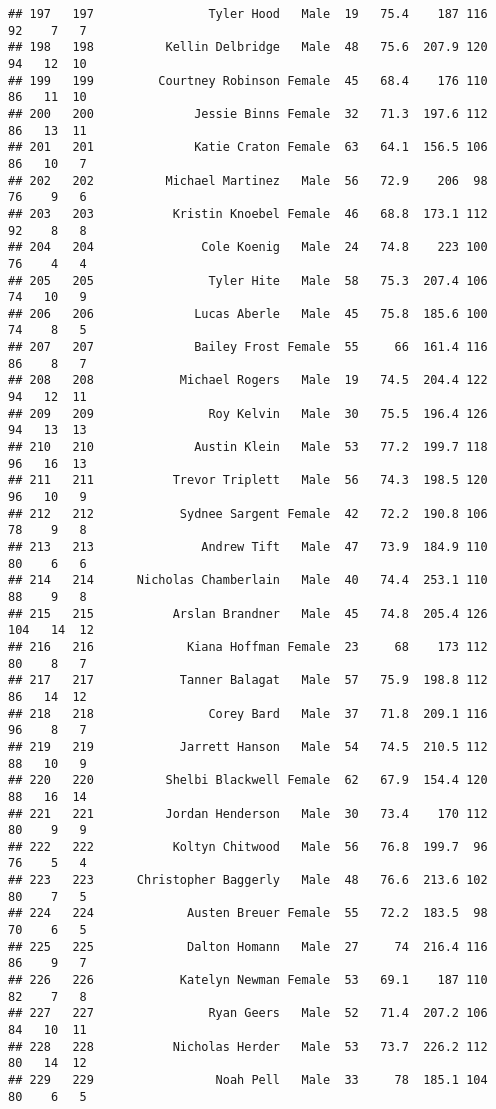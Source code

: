 \documentclass[
]{article}
\begin{document}
\begin{verbatim}
## 197   197                Tyler Hood   Male  19   75.4    187 116  92    7   7
## 198   198          Kellin Delbridge   Male  48   75.6  207.9 120  94   12  10
## 199   199         Courtney Robinson Female  45   68.4    176 110  86   11  10
## 200   200              Jessie Binns Female  32   71.3  197.6 112  86   13  11
## 201   201              Katie Craton Female  63   64.1  156.5 106  86   10   7
## 202   202          Michael Martinez   Male  56   72.9    206  98  76    9   6
## 203   203           Kristin Knoebel Female  46   68.8  173.1 112  92    8   8
## 204   204               Cole Koenig   Male  24   74.8    223 100  76    4   4
## 205   205                Tyler Hite   Male  58   75.3  207.4 106  74   10   9
## 206   206              Lucas Aberle   Male  45   75.8  185.6 100  74    8   5
## 207   207              Bailey Frost Female  55     66  161.4 116  86    8   7
## 208   208            Michael Rogers   Male  19   74.5  204.4 122  94   12  11
## 209   209                Roy Kelvin   Male  30   75.5  196.4 126  94   13  13
## 210   210              Austin Klein   Male  53   77.2  199.7 118  96   16  13
## 211   211           Trevor Triplett   Male  56   74.3  198.5 120  96   10   9
## 212   212            Sydnee Sargent Female  42   72.2  190.8 106  78    9   8
## 213   213               Andrew Tift   Male  47   73.9  184.9 110  80    6   6
## 214   214      Nicholas Chamberlain   Male  40   74.4  253.1 110  88    9   8
## 215   215           Arslan Brandner   Male  45   74.8  205.4 126 104   14  12
## 216   216             Kiana Hoffman Female  23     68    173 112  80    8   7
## 217   217            Tanner Balagat   Male  57   75.9  198.8 112  86   14  12
## 218   218                Corey Bard   Male  37   71.8  209.1 116  96    8   7
## 219   219            Jarrett Hanson   Male  54   74.5  210.5 112  88   10   9
## 220   220          Shelbi Blackwell Female  62   67.9  154.4 120  88   16  14
## 221   221          Jordan Henderson   Male  30   73.4    170 112  80    9   9
## 222   222           Koltyn Chitwood   Male  56   76.8  199.7  96  76    5   4
## 223   223      Christopher Baggerly   Male  48   76.6  213.6 102  80    7   5
## 224   224             Austen Breuer Female  55   72.2  183.5  98  70    6   5
## 225   225             Dalton Homann   Male  27     74  216.4 116  86    9   7
## 226   226            Katelyn Newman Female  53   69.1    187 110  82    7   8
## 227   227                Ryan Geers   Male  52   71.4  207.2 106  84   10  11
## 228   228           Nicholas Herder   Male  53   73.7  226.2 112  80   14  12
## 229   229                 Noah Pell   Male  33     78  185.1 104  80    6   5

\end{verbatim}
\end{document}
